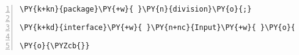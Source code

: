 \begin{Verbatim}[commandchars=\\\{\},numbers=left,firstnumber=1,stepnumber=1,frame=single,fontsize=\small]
\PY{k+kn}{package}\PY{+w}{ }\PY{n}{division}\PY{o}{;}

\PY{k+kd}{interface}\PY{+w}{ }\PY{n+nc}{Input}\PY{+w}{ }\PY{o}{\PYZob{}}

\PY{o}{\PYZcb{}}
\end{Verbatim}
